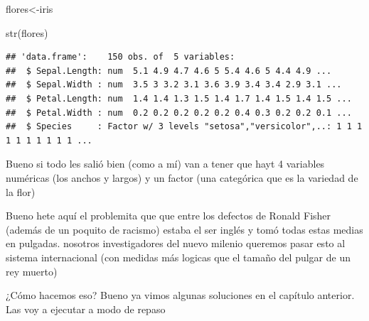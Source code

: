 \documentclass[
]{book}
\newenvironment{Shaded}{\begin{snugshade}}{\end{snugshade}}
\newcommand{\CommentTok}[1]{\textcolor[rgb]{0.56,0.35,0.01}{\textit{#1}}}
\newcommand{\FloatTok}[1]{\textcolor[rgb]{0.00,0.00,0.81}{#1}}
\newcommand{\FunctionTok}[1]{\textcolor[rgb]{0.00,0.00,0.00}{#1}}
\newcommand{\NormalTok}[1]{#1}
\newcommand{\OtherTok}[1]{\textcolor[rgb]{0.56,0.35,0.01}{#1}}
\newcommand{\SpecialCharTok}[1]{\textcolor[rgb]{0.00,0.00,0.00}{#1}}
\begin{document}
\begin{Shaded}
\begin{Highlighting}[]
\NormalTok{flores}\OtherTok{\textless{}{-}}\NormalTok{iris}

\FunctionTok{str}\NormalTok{(flores)}
\end{Highlighting}
\end{Shaded}

\begin{verbatim}
## 'data.frame':    150 obs. of  5 variables:
##  $ Sepal.Length: num  5.1 4.9 4.7 4.6 5 5.4 4.6 5 4.4 4.9 ...
##  $ Sepal.Width : num  3.5 3 3.2 3.1 3.6 3.9 3.4 3.4 2.9 3.1 ...
##  $ Petal.Length: num  1.4 1.4 1.3 1.5 1.4 1.7 1.4 1.5 1.4 1.5 ...
##  $ Petal.Width : num  0.2 0.2 0.2 0.2 0.2 0.4 0.3 0.2 0.2 0.1 ...
##  $ Species     : Factor w/ 3 levels "setosa","versicolor",..: 1 1 1 1 1 1 1 1 1 1 ...
\end{verbatim}

Bueno si todo les salió bien (como a mí) van a tener que hayt 4 variables numéricas (los anchos y largos) y un factor (una categórica que es la variedad de la flor)

Bueno hete aquí el problemita que que entre los defectos de Ronald Fisher (además de un poquito de racismo) estaba el ser inglés y tomó todas estas medias en pulgadas. nosotros investigadores del nuevo milenio queremos pasar esto al sistema internacional (con medidas más logicas que el tamaño del pulgar de un rey muerto)

¿Cómo hacemos eso? Bueno ya vimos algunas soluciones en el capítulo anterior. Las voy a ejecutar a modo de repaso

\begin{Shaded}
\end{Shaded}
\end{document}
